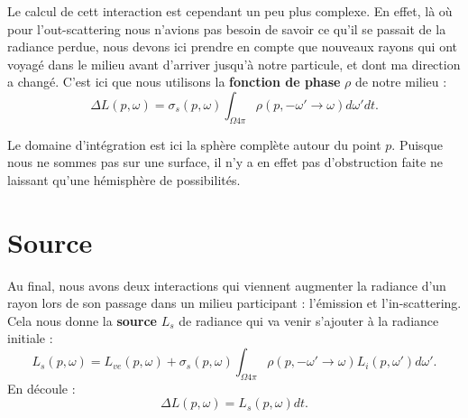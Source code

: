 Le calcul de cett interaction est cependant un peu plus complexe. En effet, là où pour l'out-scattering nous n'avions pas besoin de savoir ce qu'il se passait de la radiance perdue, nous devons ici prendre en compte que nouveaux rayons qui ont voyagé dans le milieu avant d'arriver jusqu'à notre particule, et dont ma direction a changé. C'est ici que nous utilisons la \textbf{fonction de phase} $\rho$ de notre milieu :
\large \begin{equation}
  \Delta L(p, \omega) = \sigma_{s}(p, \omega) \int_{\Omega4\pi}\rho(p, -\omega'\longrightarrow\omega)d\omega' dt  
.\end{equation} \normalsize \par

Le domaine d'intégration est ici la sphère complète autour du point $p$. Puisque nous ne sommes pas sur une surface, il n'y a en effet pas d'obstruction faite ne laissant qu'une hémisphère de possibilités.

\section{Source}

Au final, nous avons deux interactions qui viennent augmenter la radiance d'un rayon lors de son passage dans un milieu participant : l'émission et l'in-scattering. Cela nous donne la \textbf{source} $L_s$ de radiance qui va venir s'ajouter à la radiance initiale :
\large \begin{equation}\label{eq:source}
    L_s(p, \omega) = L_{ve}(p, \omega) + \sigma_{s}(p, \omega) \int_{\Omega4\pi}\rho(p, -\omega'\longrightarrow\omega)L_i(p, \omega')d\omega'
.\end{equation} \normalsize
En découle :
\large \begin{equation}
    \Delta L(p, \omega) = L_s(p, \omega)dt
.\end{equation} \normalsize